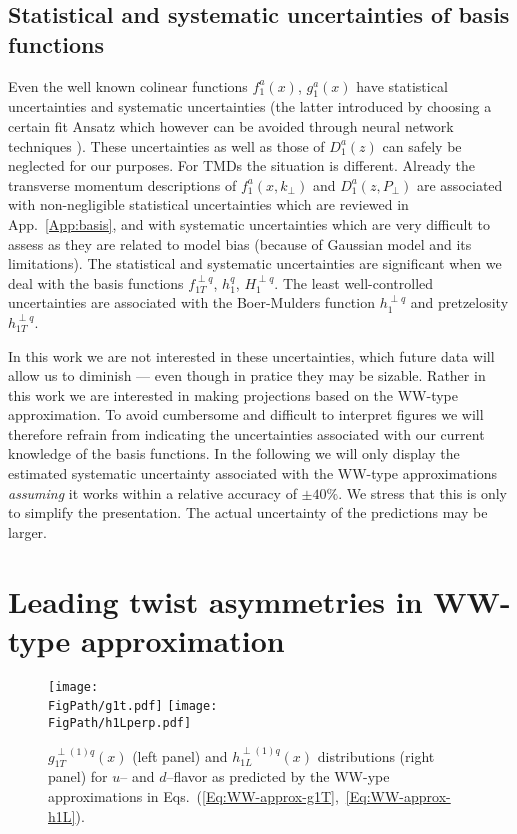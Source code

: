 \documentclass[a4paper,11pt]{article}
\newcommand{\blue}[1]{{\color{blue} #1}}
\newcommand{\ps}[1]{\blue{ #1}}
\def\kperp{k_\perp}
\def\pperp{P_\perp}
\newcommand*{\FigPath}{./figs}%
\begin{document}
\ps{

\subsection{Statistical and systematic uncertainties of basis functions}

Even the well known colinear functions $f_1^a(x)$, $g_1^a(x)$ have 
statistical uncertainties and systematic uncertainties (the latter
introduced by choosing a certain fit Ansatz which however can be 
avoided through neural network techniques \cite{Ball:2014uwa}).
These uncertainties as well as those of $D_1^a(z)$ can safely
be neglected for our purposes. 
For TMDs the situation is different. Already the transverse
momentum descriptions of $f_1^a(x,\kperp)$ and $D_1^a(z,\pperp)$ 
are associated with non-negligible statistical uncertainties
which are reviewed in App.~\ref{App:basis}, and with systematic
uncertainties which are very difficult to assess as they are
related to model bias (because of Gaussian model and its limitations).
The statistical and systematic uncertainties are significant
when we deal with the basis functions 
$f_{1T}^{\perp q}$, $h_{1}^{q}$, $H_{1}^{\perp q}$.
The least well-controlled uncertainties are associated with the 
Boer-Mulders function $h_1^{\perp q}$ and pretzelosity $h_{1T}^{\perp q}$.

In this work we are not interested in these uncertainties, which
future data will allow us to diminish --- even though in pratice 
they may be sizable. Rather in this work we are interested in
making projections based on the WW-type approximation. To avoid
cumbersome and difficult to interpret figures we will therefore
refrain from indicating the uncertainties associated with our
current knowledge of the basis functions. In the following
we will only display the estimated systematic uncertainty
associated with the WW-type approximations {\it assuming}
it works within a relative accuracy of $\pm40\%$.
We stress that this is only to simplify the presentation. The 
actual uncertainty of the predictions may be larger.

}

\section{Leading twist asymmetries in WW-type approximation}
\label{Sec-6:twist-2-and-WW}

\begin{figure}[b!]
\centering
\texttt{[image: \\FigPath/g1t.pdf]} \quad
\texttt{[image: \\FigPath/h1Lperp.pdf]}
	\caption{\label{g1t_h1l_functions} 
	$g^{\perp (1) q}_{1T}(x)$ (left panel) and
	$h^{\perp (1) q}_{1L}(x)$ distributions (right panel) 
	for $u$-- and $d$--flavor 
	as predicted by the WW-ype approximations in
	Eqs.~(\ref{Eq:WW-approx-g1T},~\ref{Eq:WW-approx-h1L}).}
\end{figure}
\end{document}
